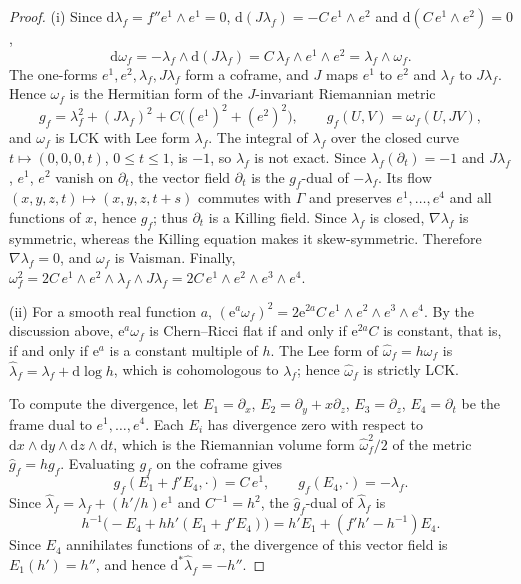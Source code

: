 \begin{proof}
(i) Since $\mathrm d\lambda_f=f''e^1\wedge e^1=0$, $\mathrm d(J\lambda_f)=-C\,e^1\wedge e^2$ and $\mathrm d(C\,e^1\wedge e^2)=0$,
\[
 \mathrm d\omega_f=-\lambda_f\wedge\mathrm d(J\lambda_f)
 =C\,\lambda_f\wedge e^1\wedge e^2=\lambda_f\wedge\omega_f.
\]
The one-forms $e^1,e^2,\lambda_f,J\lambda_f$ form a coframe, and $J$ maps $e^1$ to $e^2$ and $\lambda_f$ to $J\lambda_f$. Hence $\omega_f$ is the Hermitian form of the $J$-invariant Riemannian metric
\[
 g_f=\lambda_f^2+(J\lambda_f)^2+C\bigl((e^1)^2+(e^2)^2\bigr),
 \qquad g_f(U,V)=\omega_f(U,JV),
\]
and $\omega_f$ is LCK with Lee form $\lambda_f$. The integral of $\lambda_f$ over the closed curve $t\mapsto(0,0,0,t)$, $0\leq t\leq1$, is $-1$, so $\lambda_f$ is not exact. Since $\lambda_f(\partial_t)=-1$ and $J\lambda_f$, $e^1$, $e^2$ vanish on $\partial_t$, the vector field $\partial_t$ is the $g_f$-dual of $-\lambda_f$. Its flow $(x,y,z,t)\mapsto(x,y,z,t+s)$ commutes with $\Gamma$ and preserves $e^1,\dots,e^4$ and all functions of $x$, hence $g_f$; thus $\partial_t$ is a Killing field. Since $\lambda_f$ is closed, $\nabla\lambda_f$ is symmetric, whereas the Killing equation makes it skew-symmetric. Therefore $\nabla\lambda_f=0$, and $\omega_f$ is Vaisman. Finally, $\omega_f^2=2C\,e^1\wedge e^2\wedge\lambda_f\wedge J\lambda_f=2C\,e^1\wedge e^2\wedge e^3\wedge e^4$.

(ii) For a smooth real function $a$, $(\mathrm e^a\omega_f)^2=2\mathrm e^{2a}C\,e^1\wedge e^2\wedge e^3\wedge e^4$. By the discussion above, $\mathrm e^a\omega_f$ is Chern--Ricci flat if and only if $\mathrm e^{2a}C$ is constant, that is, if and only if $\mathrm e^a$ is a constant multiple of $h$. The Lee form of $\widehat\omega_f=h\omega_f$ is $\widehat\lambda_f=\lambda_f+\mathrm d\log h$, which is cohomologous to $\lambda_f$; hence $\widehat\omega_f$ is strictly LCK.

To compute the divergence, let $E_1=\partial_x$, $E_2=\partial_y+x\partial_z$, $E_3=\partial_z$, $E_4=\partial_t$ be the frame dual to $e^1,\dots,e^4$. Each $E_i$ has divergence zero with respect to $\mathrm dx\wedge\mathrm dy\wedge\mathrm dz\wedge\mathrm dt$, which is the Riemannian volume form $\widehat\omega_f^2/2$ of the metric $\widehat g_f=hg_f$. Evaluating $g_f$ on the coframe gives
\[
 g_f(E_1+f'E_4,\cdot)=C\,e^1,\qquad g_f(E_4,\cdot)=-\lambda_f.
\]
Since $\widehat\lambda_f=\lambda_f+(h'/h)e^1$ and $C^{-1}=h^2$, the $\widehat g_f$-dual of $\widehat\lambda_f$ is
\[
 h^{-1}\bigl(-E_4+hh'(E_1+f'E_4)\bigr)=h'E_1+(f'h'-h^{-1})E_4.
\]
Since $E_4$ annihilates functions of $x$, the divergence of this vector field is $E_1(h')=h''$, and hence $\mathrm d^*\widehat\lambda_f=-h''$.


\end{proof}

